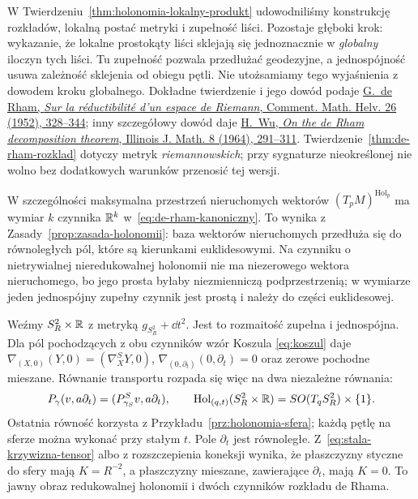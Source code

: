 W Twierdzeniu~\ref{thm:holonomia-lokalny-produkt}
udowodniliśmy konstrukcję rozkładów, lokalną postać
metryki i zupełność liści. Pozostaje głęboki krok:
wykazanie, że lokalne prostokąty liści sklejają się
jednoznacznie w \emph{globalny} iloczyn tych liści.
Tu zupełność pozwala przedłużać geodezyjne, a
jednospójność usuwa zależność sklejenia od obiegu
pętli. Nie utożsamiamy tego wyjaśnienia z dowodem
kroku globalnego. Dokładne twierdzenie i jego dowód
podaje \href{https://doi.org/10.1007/BF02564308}
{G.~de Rham, \emph{Sur la réductibilité d'un espace de Riemann},
Comment. Math. Helv. 26 (1952), 328--344};
inny szczegółowy dowód daje
\href{https://doi.org/10.1215/ijm/1256059674}
{H.~Wu, \emph{On the de Rham decomposition theorem},
Illinois J. Math. 8 (1964), 291--311}.
Twierdzenie~\ref{thm:de-rham-rozklad} dotyczy metryk
\emph{riemannowskich}; przy sygnaturze nieokreślonej
nie wolno bez dodatkowych warunków przenosić tej wersji.

W szczególności maksymalna przestrzeń nieruchomych
wektorów $(T_pM)^{\operatorname{Hol}_p}$ ma wymiar $k$
czynnika $\mathbb{R}^k$ w~\eqref{eq:de-rham-kanoniczny}.
To wynika z Zasady~\ref{prop:zasada-holonomii}:
baza wektorów nieruchomych przedłuża się do równoległych
pól, które są kierunkami euklidesowymi. Na czynniku
o nietrywialnej nieredukowalnej holonomii nie ma
niezerowego wektora nieruchomego, bo jego prosta byłaby
niezmienniczą podprzestrzenią; w wymiarze jeden
jednospójny zupełny czynnik jest prostą i należy
do części euklidesowej.

\begin{przyklad}
\label{prz:de-rham-sfera-prosta}
Weźmy $S_R^2\times\mathbb{R}$ z metryką $g_{S_R^2}+\dd t^2$.
Jest to rozmaitość zupełna i jednospójna. Dla pól
pochodzących z obu czynników wzór Koszula
\eqref{eq:koszul} daje
$\nabla_{(X,0)}(Y,0)=(\nabla^{S}_XY,0)$,
$\nabla_{(0,\partial_t)}(0,\partial_t)=0$
oraz zerowe pochodne mieszane. Równanie transportu
rozpada się więc na dwa niezależne równania:
\[
 P_{\gamma}(v,a\partial_t)
   =(P_{\gamma_S}^{S}v,a\partial_t),
 \qquad
 \operatorname{Hol}_{(q,t)}(S_R^2\times\mathbb{R})
      =SO(T_qS_R^2)\times\{1\}.
\]
Ostatnia równość korzysta z
Przykładu~\ref{prz:holonomia-sfera}; każdą pętlę
na sferze można wykonać przy stałym $t$.
Pole $\partial_t$ jest równoległe. Z~\eqref{eq:stala-krzywizna-tensor}
albo z rozszczepienia koneksji wynika, że płaszczyzny
styczne do sfery mają $K=R^{-2}$, a płaszczyzny
mieszane, zawierające $\partial_t$, mają $K=0$.
To jawny obraz redukowalnej holonomii i dwóch czynników
rozkładu de Rhama.
\end{przyklad}


